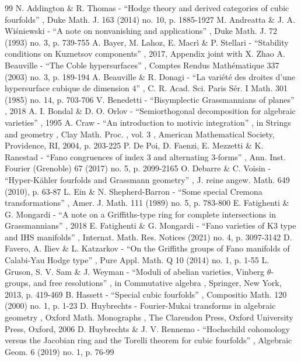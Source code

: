 \documentclass[11pt]{article}
\theoremstyle{plain}
\theoremstyle{definition}
\begin{document}
\begin{thebibliography}{99}
 N. Addington \& R. Thomas - “Hodge theory and derived categories of cubic fourfolds” , Duke Math. J. 163 (2014) no. 10, p. 1885-1927
 M. Andreatta \& J. A. Wiśniewski - “A note on nonvanishing and applications” , Duke Math. J. 72 (1993) no. 3, p. 739-755
 A. Bayer, M. Lahoz, E. Macrì \& P. Stellari - “Stability conditions on Kuznetsov components” , 2017, Appendix joint with X. Zhao
 A. Beauville - “The Coble hypersurfaces” , Comptes Rendus Mathématique 337 (2003) no. 3, p. 189-194
 A. Beauville \& R. Donagi - “La variété des droites d’une hypersurface cubique de dimension $4$” , C. R. Acad. Sci. Paris Sér. I Math. 301 (1985) no. 14, p. 703-706
 V. Benedetti - “Bisymplectic Grassmannians of planes” , 2018
 A. I. Bondal \& D. O. Orlov - “Semiorthogonal decomposition for algebraic varieties” , 1995
 A. Craw - “An introduction to motivic integration” , in Strings and geometry , Clay Math. Proc. , vol. 3 , American Mathematical Society, Providence, RI, 2004, p. 203-225
 P. De Poi, D. Faenzi, E. Mezzetti \& K. Ranestad - “Fano congruences of index 3 and alternating 3-forms” , Ann. Inst. Fourier (Grenoble) 67 (2017) no. 5, p. 2099-2165
 O. Debarre \& C. Voisin - “Hyper-Kähler fourfolds and Grassmann geometry” , J. reine angew. Math. 649 (2010), p. 63-87
 L. Ein \& N. Shepherd-Barron - “Some special Cremona transformations” , Amer. J. Math. 111 (1989) no. 5, p. 783-800
 E. Fatighenti \& G. Mongardi - “A note on a Griffiths-type ring for complete intersections in Grassmannians” , 2018
 E. Fatighenti \& G. Mongardi - “Fano varieties of K3 type and IHS manifolds” , Internat. Math. Res. Notices (2021) no. 4, p. 3097-3142
 D. Favero, A. Iliev \& L. Katzarkov - “On the Griffiths groups of Fano manifolds of Calabi-Yau Hodge type” , Pure Appl. Math. Q 10 (2014) no. 1, p. 1-55
 L. Gruson, S. V. Sam \& J. Weyman - “Moduli of abelian varieties, Vinberg $\theta $-groups, and free resolutions” , in Commutative algebra , Springer, New York, 2013, p. 419-469
 B. Hassett - “Special cubic fourfolds” , Compositio Math. 120 (2000) no. 1, p. 1-23
 D. Huybrechts - Fourier-Mukai transforms in algebraic geometry , Oxford Math. Monographs , The Clarendon Press, Oxford University Press, Oxford, 2006
 D. Huybrechts \& J. V. Rennemo - “Hochschild cohomology versus the Jacobian ring and the Torelli theorem for cubic fourfolds” , Algebraic Geom. 6 (2019) no. 1, p. 76-99

\end{thebibliography}
\end{document}
